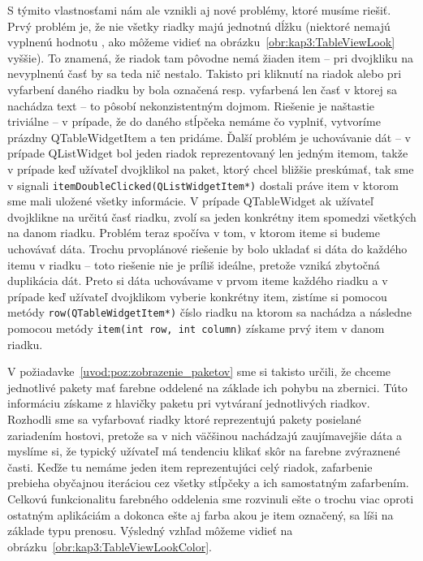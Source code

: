 S týmito vlastnosťami nám ale vznikli aj nové problémy, ktoré musíme riešiť. Prvý problém je, že nie všetky riadky majú jednotnú dĺžku (niektoré nemajú vyplnenú hodnotu , ako môžeme vidieť na obrázku~\ref{obr:kap3:TableViewLook} vyššie). To znamená, že riadok tam pôvodne nemá žiaden item -- pri dvojkliku na nevyplnenú časť by sa teda nič nestalo. Takisto pri kliknutí na riadok alebo pri vyfarbení daného riadku by bola označená resp. vyfarbená len časť v ktorej sa nachádza text -- to pôsobí nekonzistentným dojmom. Riešenie je naštastie triviálne -- v prípade, že do daného stĺpčeka nemáme čo vyplniť, vytvoríme prázdny QTableWidgetItem a ten pridáme. Ďalší problém je uchovávanie dát -- v prípade QListWidget bol jeden riadok reprezentovaný len jedným itemom, takže v prípade keď užívateľ dvojklikol na paket, ktorý chcel bližšie preskúmať, tak sme v signali \texttt{itemDoubleClicked(QListWidgetItem*)} dostali práve item v ktorom sme mali uložené všetky informácie. V prípade QTableWidget ak užívateľ dvojklikne na určitú časť riadku, zvolí sa jeden konkrétny item spomedzi všetkých na danom riadku. Problém teraz spočíva v tom, v ktorom iteme si budeme uchovávať dáta. Trochu prvoplánové riešenie by bolo ukladať si dáta do každého itemu v riadku -- toto riešenie nie je príliš ideálne, pretože vzniká zbytočná duplikácia dát. Preto si dáta uchovávame v prvom iteme každého riadku a v prípade keď užívateľ dvojklikom vyberie konkrétny item, zistíme si pomocou metódy \texttt{row(QTableWidgetItem*)} číslo riadku na ktorom sa nachádza a následne pomocou metódy \texttt{item(int row, int column)} získame prvý item v danom riadku.

V požiadavke~\ref{uvod:poz:zobrazenie_paketov} sme si takisto určili, že chceme jednotlivé pakety mať farebne oddelené na základe ich pohybu na zbernici. Túto informáciu získame z hlavičky paketu pri vytváraní jednotlivých riadkov. Rozhodli sme sa vyfarbovať riadky ktoré reprezentujú pakety posielané zariadením hostovi, pretože sa v nich väčšinou nachádzajú zaujímavejšie dáta a myslíme si, že typický užívateľ má tendenciu klikať skôr na farebne zvýraznené časti. Keďže tu nemáme jeden item reprezentujúci celý riadok, zafarbenie prebieha obyčajnou iteráciou cez všetky stĺpčeky a ich samostatným zafarbením. Celkovú funkcionalitu farebného oddelenia sme rozvinuli ešte o trochu viac oproti ostatným aplikáciám a dokonca ešte aj farba akou je item označený, sa líši na základe typu prenosu. Výsledný vzhľad môžeme vidieť na obrázku~\ref{obr:kap3:TableViewLookColor}.

